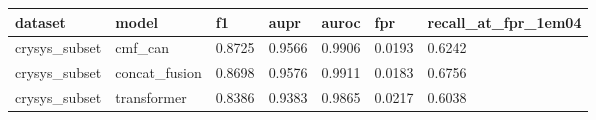\begin{tabular}{lllllll}
\toprule
dataset & model & f1 & aupr & auroc & fpr & recall\_at\_fpr\_1em04 \\
\midrule
crysys\_subset & cmf\_can & 0.8725 & 0.9566 & 0.9906 & 0.0193 & 0.6242 \\
crysys\_subset & concat\_fusion & 0.8698 & 0.9576 & 0.9911 & 0.0183 & 0.6756 \\
crysys\_subset & transformer & 0.8386 & 0.9383 & 0.9865 & 0.0217 & 0.6038 \\
\bottomrule
\end{tabular}
